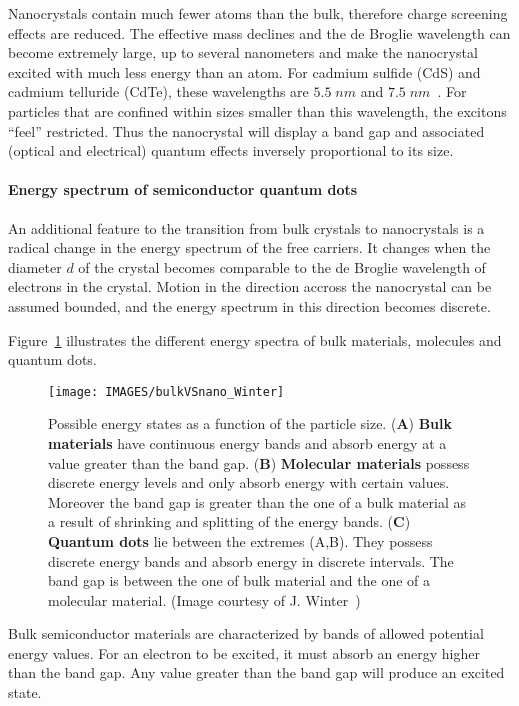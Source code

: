 Nanocrystals contain much fewer atoms than the bulk, therefore charge screening effects are reduced. The effective mass declines and the de Broglie wavelength can become extremely large, up to several nanometers and make the nanocrystal excited with much less energy than an atom. For cadmium sulfide (CdS) and cadmium telluride (CdTe), these wavelengths are $5.5 \;nm$ and $7.5 \;nm$~\cite{Winter2004}. For particles that are confined within sizes smaller than this wavelength, the excitons ``feel'' restricted. Thus the nanocrystal will display a band gap and associated (optical and electrical) quantum effects inversely proportional to its size. 

\paragraph{Energy spectrum of semiconductor quantum dots}
An additional feature to the transition from bulk crystals to nanocrystals is a radical change in the energy spectrum of the free carriers. It changes when the diameter $d$ of the crystal becomes comparable to the de Broglie wavelength of electrons in the crystal.
Motion in the direction accross the nanocrystal can be assumed bounded, and the energy spectrum in this direction becomes discrete.

Figure~\ref{fig:bulkvsnano} illustrates the different energy spectra of bulk materials, molecules and quantum dots. 
\begin{figure} 
 \centering
 \texttt{[image: IMAGES/bulkVSnano\_Winter]}
 \caption{Possible energy states as a function of the particle size. \newline(\textbf{A}) \textbf{Bulk materials}  have continuous energy bands and absorb energy at a value greater than the band gap. (\textbf{B}) \textbf{Molecular materials} possess discrete energy levels and only absorb energy with certain values. Moreover the band gap is greater than the one of a bulk material as a result of shrinking and splitting of the energy bands. (\textbf{C}) \textbf{Quantum dots} lie between the extremes (A,B). They possess discrete energy bands and absorb energy in discrete intervals. The band gap is between the one of bulk material and the one of a molecular material.
(Image courtesy of J. Winter~\cite{Winter2004})}
 \label{fig:bulkvsnano}
\end{figure}

Bulk semiconductor materials are characterized by bands of allowed potential energy values. For an electron to be excited, it must absorb an energy higher than the band gap. Any value greater than the band gap will produce an excited state.

